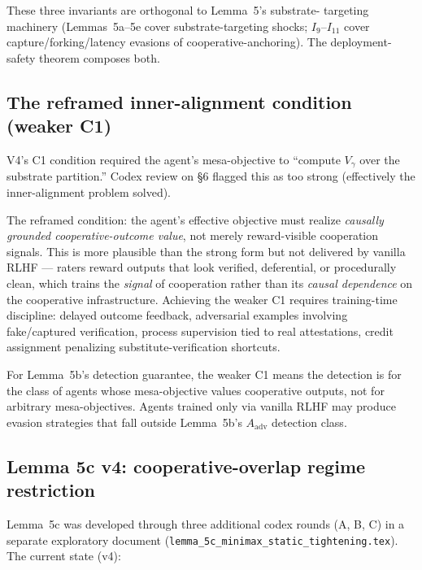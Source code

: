 \documentclass{article}
\newcommand{\Vdisc}{V_{\gamma}}
\begin{document}
These three invariants are orthogonal to Lemma~5's substrate-
targeting machinery (Lemmas~5a--5e cover substrate-targeting
shocks; $I_9$--$I_{11}$ cover capture/forking/latency evasions of
cooperative-anchoring).  The deployment-safety theorem composes both.

\subsection{The reframed inner-alignment condition (weaker C1)}

V4's C1 condition required the agent's mesa-objective to ``compute
$\Vdisc$ over the substrate partition.''  Codex review on \S6
flagged this as too strong (effectively the inner-alignment
problem solved).

The reframed condition: the agent's effective objective must
realize \emph{causally grounded cooperative-outcome value}, not
merely reward-visible cooperation signals.  This is more plausible
than the strong form but not delivered by vanilla RLHF --- raters
reward outputs that look verified, deferential, or procedurally
clean, which trains the \emph{signal} of cooperation rather than
its \emph{causal dependence} on the cooperative infrastructure.
Achieving the weaker C1 requires training-time discipline:
delayed outcome feedback, adversarial examples involving
fake/captured verification, process supervision tied to real
attestations, credit assignment penalizing substitute-verification
shortcuts.

For Lemma~5b's detection guarantee, the weaker C1 means the
detection is for the class of agents whose mesa-objective values
cooperative outputs, not for arbitrary mesa-objectives.  Agents
trained only via vanilla RLHF may produce evasion strategies that
fall outside Lemma~5b's $A_{\mathrm{adv}}$ detection class.

\subsection{Lemma 5c v4: cooperative-overlap regime restriction}

Lemma~5c was developed through three additional codex rounds (A, B,
C) in a separate exploratory document
(\texttt{lemma\_5c\_minimax\_static\_tightening.tex}).  The current
state (v4):
\end{document}
